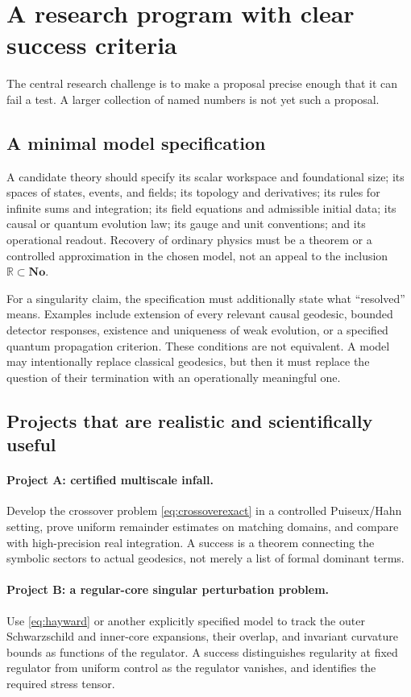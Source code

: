 \documentclass[11pt,letterpaper]{article}
\newcommand{\No}{\mathbf{No}}
\newcommand{\R}{\mathbb{R}}
\theoremstyle{definition}
\theoremstyle{remark}
\begin{document}
\section{A research program with clear success criteria}
\label{sec:research}

The central research challenge is to make a proposal precise enough that it
can fail a test. A larger collection of named numbers is not yet such a
proposal.

\subsection{A minimal model specification}

A candidate theory should specify its scalar workspace and foundational size;
its spaces of states, events, and fields; its topology and derivatives; its
rules for infinite sums and integration; its field equations and admissible
initial data; its causal or quantum evolution law; its gauge and unit
conventions; and its operational readout. Recovery of ordinary physics must
be a theorem or a controlled approximation in the chosen model, not an appeal
to the inclusion $\R\subset\No$.

For a singularity claim, the specification must additionally state what
``resolved'' means. Examples include extension of every relevant causal
geodesic, bounded detector responses, existence and uniqueness of weak
evolution, or a specified quantum propagation criterion. These conditions
are not equivalent. A model may intentionally replace classical geodesics,
but then it must replace the question of their termination with an operationally
meaningful one.

\subsection{Projects that are realistic and scientifically useful}

\paragraph{Project A: certified multiscale infall.}
Develop the crossover problem \eqref{eq:crossoverexact} in a controlled
Puiseux/Hahn setting, prove uniform remainder estimates on matching domains,
and compare with high-precision real integration. A success is a theorem
connecting the symbolic sectors to actual geodesics, not merely a list of
formal dominant terms.

\paragraph{Project B: a regular-core singular perturbation problem.}
Use \eqref{eq:hayward} or another explicitly specified model to track the
outer Schwarzschild and inner-core expansions, their overlap, and invariant
curvature bounds as functions of the regulator. A success distinguishes
regularity at fixed regulator from uniform control as the regulator vanishes,
and identifies the required stress tensor.
\end{document}
